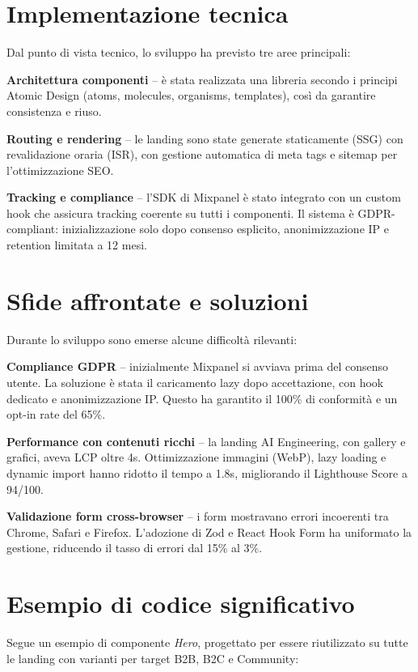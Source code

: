 \section{Implementazione tecnica}
Dal punto di vista tecnico, lo sviluppo ha previsto tre aree principali:

\textbf{Architettura componenti} – è stata realizzata una libreria secondo i
principi Atomic Design (atoms, molecules, organisms, templates), così da
garantire consistenza e riuso.  

\textbf{Routing e rendering} – le landing sono state generate staticamente
(SSG) con revalidazione oraria (ISR), con gestione automatica di meta tags e
sitemap per l’ottimizzazione SEO.  

\textbf{Tracking e compliance} – l’SDK di Mixpanel è stato integrato con un
custom hook che assicura tracking coerente su tutti i componenti. Il sistema è
GDPR-compliant: inizializzazione solo dopo consenso esplicito, anonimizzazione
IP e retention limitata a 12 mesi.

\section{Sfide affrontate e soluzioni}
Durante lo sviluppo sono emerse alcune difficoltà rilevanti:

\textbf{Compliance GDPR} – inizialmente Mixpanel si avviava prima del consenso
utente. La soluzione è stata il caricamento lazy dopo accettazione, con hook
dedicato e anonimizzazione IP. Questo ha garantito il 100\% di conformità e un
opt-in rate del 65\%.  

\textbf{Performance con contenuti ricchi} – la landing AI Engineering, con
gallery e grafici, aveva LCP oltre 4s. Ottimizzazione immagini (WebP), lazy
loading e dynamic import hanno ridotto il tempo a 1.8s, migliorando il
Lighthouse Score a 94/100.  

\textbf{Validazione form cross-browser} – i form mostravano errori incoerenti
tra Chrome, Safari e Firefox. L’adozione di Zod e React Hook Form ha uniformato
la gestione, riducendo il tasso di errori dal 15\% al 3\%.

\section{Esempio di codice significativo}
Segue un esempio di componente \textit{Hero}, progettato per essere riutilizzato
su tutte le landing con varianti per target B2B, B2C e Community:

